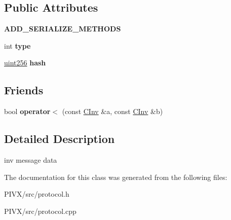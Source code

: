 \subsection*{Public Attributes}
\begin{DoxyCompactItemize}
\item 
\mbox{\label{class_c_inv_a3dc91b40ff6fe8c2c8879c81de67e209}} 
{\bfseries A\+D\+D\+\_\+\+S\+E\+R\+I\+A\+L\+I\+Z\+E\+\_\+\+M\+E\+T\+H\+O\+DS}
\item 
\mbox{\label{class_c_inv_a2da8a26c6b8824011e3144459d278c75}} 
int {\bfseries type}
\item 
\mbox{\label{class_c_inv_abfa04c38e9c0def9a2b09a9c43929744}} 
\mbox{\hyperlink{classuint256}{uint256}} {\bfseries hash}
\end{DoxyCompactItemize}
\subsection*{Friends}
\begin{DoxyCompactItemize}
\item 
\mbox{\label{class_c_inv_a2684809000d3a0523769ad7585ace197}} 
bool {\bfseries operator$<$} (const \mbox{\hyperlink{class_c_inv}{C\+Inv}} \&a, const \mbox{\hyperlink{class_c_inv}{C\+Inv}} \&b)
\end{DoxyCompactItemize}


\subsection{Detailed Description}
inv message data 

The documentation for this class was generated from the following files\+:\begin{DoxyCompactItemize}
\item 
P\+I\+V\+X/src/protocol.\+h\item 
P\+I\+V\+X/src/protocol.\+cpp\end{DoxyCompactItemize}
